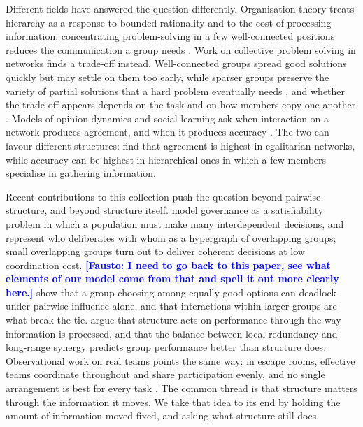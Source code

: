 \documentclass[11pt]{article}
\newcommand{\fausto}[1]{\textcolor{blue}{\textbf{[Fausto: #1]}}}
\begin{document}
Different fields have answered the question differently. Organisation theory treats hierarchy as a response to bounded rationality and to the cost of processing information: concentrating problem-solving in a few well-connected positions reduces the communication a group needs \parencite{simon1962architecture, radner1993organization, bolton1994firm}. Work on collective problem solving in networks finds a trade-off instead. Well-connected groups spread good solutions quickly but may settle on them too early, while sparser groups preserve the variety of partial solutions that a hard problem eventually needs \parencite{lazer2007network, mason2008propagation, fang2010balancing}, and whether the trade-off appears depends on the task and on how members copy one another \parencite{shore2015facts, barkoczi2016social}. Models of opinion dynamics and social learning ask when interaction on a network produces agreement, and when it produces accuracy \parencite{bala1998learning, jackson2011overview, noorazar2020classical}. The two can favour different structures: \textcite{berekmeri2020optimal} find that agreement is highest in egalitarian networks, while accuracy can be highest in hierarchical ones in which a few members specialise in gathering information. 

Recent contributions to this collection push the question beyond pairwise structure, and beyond structure itself. \textcite{hebert2025governance} model governance as a satisfiability problem in which a population must make many interdependent decisions, and represent who deliberates with whom as a hypergraph of overlapping groups; small overlapping groups turn out to deliver coherent decisions at low coordination cost. \fausto{I need to go back to this paper, see what elements of our model come from that and spell it out more clearly here.} \textcite{marchpons2026symmetry} show that a group choosing among equally good options can deadlock under pairwise influence alone, and that interactions within larger groups are what break the tie. \textcite{garg2026synergy} argue that structure acts on performance through the way information is processed, and that the balance between local redundancy and long-range synergy predicts group performance better than structure does. Observational work on real teams points the same way: in escape rooms, effective teams coordinate throughout and share participation evenly, and no single arrangement is best for every task \parencite{oszabo2026coordination}. The common thread is that structure matters through the information it moves. We take that idea to its end by holding the amount of information moved fixed, and asking what structure still does.
\end{document}
